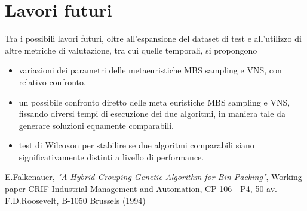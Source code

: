 \documentclass{article}
\begin{document}
\section{Lavori futuri}
Tra i possibili lavori futuri, oltre all'espansione del dataset di test e all'utilizzo di altre metriche di valutazione, tra cui quelle temporali, si propongono
\begin{itemize}
\item variazioni dei parametri delle metaeuristiche MBS sampling e VNS, con relativo confronto.
\item un possibile confronto diretto delle meta euristiche MBS sampling e VNS, fissando diversi tempi di esecuzione dei due algoritmi, in maniera tale da generare soluzioni equamente comparabili.
\item test di Wilcoxon per stabilire se due algoritmi comparabili siano significativamente distinti a livello di performance.
\end{itemize}  
\newpage
\begin{thebibliography}{9}

  E.Falkenauer,
  \textit {"A Hybrid Grouping Genetic Algorithm for Bin Packing"},
 Working paper CRIF Industrial Management and Automation, CP 106 - P4, 50
av. F.D.Roosevelt, B-1050 Brussels (1994)
\end{thebibliography}
\end{document}
